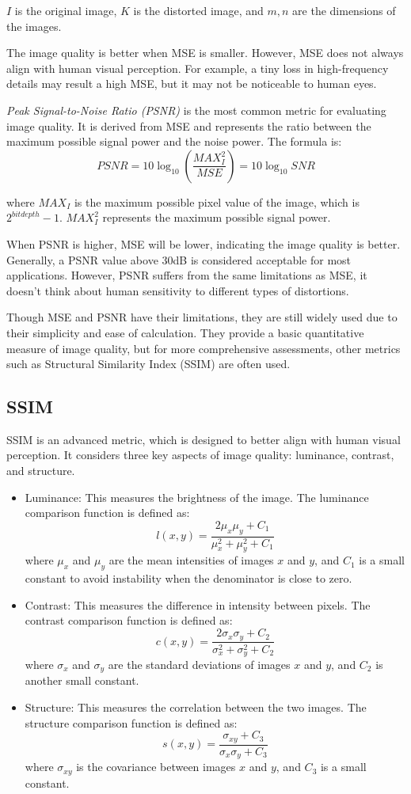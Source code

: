 \documentclass[10pt,a4paper,oneside,numbers=noenddot]{scrbook}
\theoremstyle{ctplain}
\theoremstyle{ctresult}
\begin{document}
$I$ is the original image, $K$ is the distorted image, and $m, n$ are the dimensions of
the images.

The image quality is better when MSE is smaller. However, MSE does not always align with
human visual perception. For example, a tiny loss in high-frequency details may result a
high MSE, but it may not be noticeable to human eyes.


\emph{Peak Signal-to-Noise Ratio (PSNR)} is the most common metric for evaluating image
quality. It is derived from MSE and represents the ratio between the maximum possible
signal power and the noise power. The formula is:
\[
  PSNR = 10 \log_{10} \left( \frac{MAX_I^2}{MSE} \right) = 10 \log_{10} SNR
\]

where $MAX_I$ is the maximum possible pixel value of the image, which is $2^{bit depth} - 1$.
$MAX_I^{2}$ represents the maximum possible signal power.

When PSNR is higher, MSE will be lower, indicating the image quality is better. Generally,
a PSNR value above 30dB is considered acceptable for most applications. However, PSNR suffers
from the same limitations as MSE, it doesn't think about human sensitivity to different types
of distortions.

Though MSE and PSNR have their limitations, they are still widely used due to their simplicity
and ease of calculation. They provide a basic quantitative measure of image quality, but for
more comprehensive assessments, other metrics such as Structural Similarity Index (SSIM) are
often used.

\subsection{SSIM}

SSIM is an advanced metric, which is designed to better align with human visual perception.
It considers three key aspects of image quality: luminance, contrast, and structure.
\begin{itemize}
  \item Luminance: This measures the brightness of the image. The luminance comparison
  function is defined as:
  \[
    l(x,y) = \frac{2\mu_x \mu_y + C_1}{\mu_x^2 + \mu_y^2 + C_1}
  \]
  where $\mu_x$ and $\mu_y$ are the mean intensities of images $x$ and $y$, and $C_1$ is a
  small constant to avoid instability when the denominator is close to zero.

  \item Contrast: This measures the difference in intensity between pixels. The contrast
  comparison function is defined as:
  \[
    c(x,y) = \frac{2\sigma_x \sigma_y + C_2}{\sigma_x^2 + \sigma_y^2 + C_2}
  \]
  where $\sigma_x$ and $\sigma_y$ are the standard deviations of images $x$ and $y$, and
  $C_2$ is another small constant.

  \item Structure: This measures the correlation between the two images. The structure
  comparison function is defined as:
  \[
    s(x,y) = \frac{\sigma_{xy} + C_3}{\sigma_x \sigma_y + C_3}
  \]
  where $\sigma_{xy}$ is the covariance between images $x$ and $y$, and $C_3$ is a small
  constant.
\end{itemize}
\end{document}
